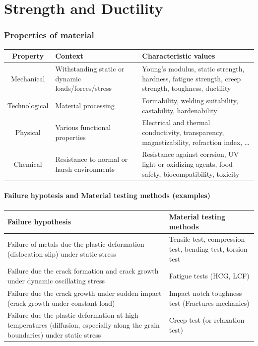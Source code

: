 \documentclass{article}
\begin{document}
\newpage
\part{Strength and Ductility}
\section{Properties of material}
\begin{center}
  \begin{tabular}{|c|p{5cm}|p{7cm}|}
    \hline
    \textbf{Property} & \textbf{Context} & \textbf{Characteristic values}\\
    \hline
    Mechanical & Withstanding static or dynamic loads/forces/stress & Young's modulus, static strength, hardness, fatigue strength, creep strength, toughness, ductility\\
    \hline
    Technological & Material processing & Formability, welding suitability, castability, hardenability\\
    \hline
    Physical & Various functional properties & Electrical and thermal conductivity, transparency, magnetizability, refraction index, \ldots\\
    \hline
    Chemical & Resistance to normal or harsh environments & Resistance against corrsion, UV light or oxidizing agents, food safety, biocompatibility, toxicity\\
    \hline
  \end{tabular}
\end{center}

\subsection{Failure hypotesis and Material testing methods (examples)}
\begin{center}
  \begin{tabular}{|p{7cm}|l|}
    \hline
    \textbf{Failure hypothesis} & \textbf{Material testing methods}\\
    \hline
    Failure of metals due the plastic deformation (dislocation slip) under static stress & Tensile test, compression test, bending test, torsion test\\
    \hline
    Failure due the crack formation and crack growth under dynamic oscillating stress & Fatigue tests (HCG, LCF)\\
    \hline
    Failure due the crack growth under sudden impact (crack growth under constant load) & Impact notch toughness test (Fractures mechanics)\\
    \hline
    Failure due the plastic deformation at high temperatures (diffusion, especially along the grain boundaries) under static stress & Creep test (or relaxation test)\\
    \hline
  \end{tabular}
\end{center}
\end{document}
